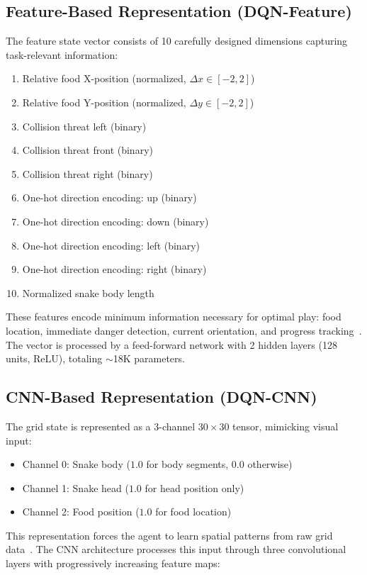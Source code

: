 \documentclass[10pt,a4paper,twocolumn]{article}
\begin{document}
\subsection{Feature-Based Representation (DQN-Feature)}

The feature state vector consists of 10 carefully designed dimensions capturing task-relevant information:
\begin{enumerate}
\item Relative food X-position (normalized, $\Delta x \in [-2, 2]$)
\item Relative food Y-position (normalized, $\Delta y \in [-2, 2]$)
\item Collision threat left (binary)
\item Collision threat front (binary)
\item Collision threat right (binary)
\item One-hot direction encoding: up (binary)
\item One-hot direction encoding: down (binary)
\item One-hot direction encoding: left (binary)
\item One-hot direction encoding: right (binary)
\item Normalized snake body length
\end{enumerate}

These features encode minimum information necessary for optimal play: food location, immediate danger detection, current orientation, and progress tracking~\cite{sharma2017autonomoussnake}. The vector is processed by a feed-forward network with 2 hidden layers (128 units, ReLU), totaling $\sim$18K parameters.

\subsection{CNN-Based Representation (DQN-CNN)}

The grid state is represented as a 3-channel $30 \times 30$ tensor, mimicking visual input:
\begin{itemize}
    \item Channel 0: Snake body ($1.0$ for body segments, $0.0$ otherwise)
    \item Channel 1: Snake head ($1.0$ for head position only)
    \item Channel 2: Food position ($1.0$ for food location)
\end{itemize}

This representation forces the agent to learn spatial patterns from raw grid data~\cite{mnih2015human}. The CNN architecture processes this input through three convolutional layers with progressively increasing feature maps:
\end{document}

